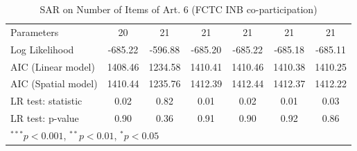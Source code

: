 \begin{table}[!h]
\begin{center}
\begin{tabular}{l c c c c c c }
Parameters              & 20           & 21           & 21           & 21           & 21           & 21           \\
Log Likelihood          & -685.22      & -596.88      & -685.20      & -685.22      & -685.18      & -685.11      \\
AIC (Linear model)      & 1408.46      & 1234.58      & 1410.41      & 1410.46      & 1410.38      & 1410.25      \\
AIC (Spatial model)     & 1410.44      & 1235.76      & 1412.39      & 1412.44      & 1412.37      & 1412.22      \\
LR test: statistic      & 0.02         & 0.82         & 0.01         & 0.02         & 0.01         & 0.03         \\
LR test: p-value        & 0.90         & 0.36         & 0.91         & 0.90         & 0.92         & 0.86         \\
\bottomrule
\multicolumn{7}{l}{\scriptsize{$^{***}p<0.001$, $^{**}p<0.01$, $^*p<0.05$}}
\end{tabular}
\caption{SAR on Number of Items of Art. 6 (FCTC INB co-participation)}
\label{table:coefficients}
\end{center}
\end{table}

